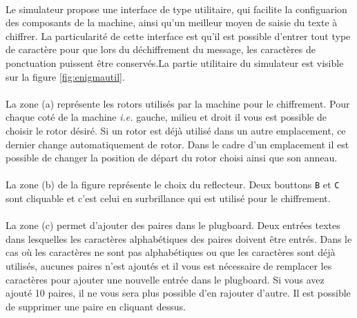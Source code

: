 \documentclass[letterpaper]{article}
\begin{document}
\paragraph{}
Le simulateur propose une interface de type utilitaire, qui facilite la configuarion des composants de la machine, ainsi qu'un meilleur moyen de saisie du texte à chiffrer. La particularité de cette interface est qu'il est possible d'entrer tout type de caractère pour que lors du déchiffrement du message, les caractères de ponctuation puissent être conservés.La partie utilitaire du simulateur est visible sur la figure \ref{fig:enigmautil}.

\paragraph{}

La zone (a) représente les rotors utilisés par la machine pour le chiffrement. Pour chaque coté de la machine \textit{i.e.} gauche, milieu et droit il vous est possible de choisir le rotor désiré. Si un rotor est déjà utilisé dans un autre emplacement, ce dernier change automatiquement de rotor. Dans le cadre d'un emplacement il est possible de changer la position de départ du rotor choisi ainsi que son anneau.

\paragraph{}
La zone (b) de la figure représente le choix du reflecteur. Deux bouttons \texttt{B} et \texttt{C} sont cliquable et c'est celui en surbrillance qui est utilisé pour le chiffrement.

\paragraph{}

La zone (c) permet d'ajouter des paires dans le plugboard. Deux entrées textes dans lesquelles les caractères alphabétiques des paires doivent être entrés. Dans le cas où les caractères ne sont pas alphabétiques ou que les caractères sont déjà utilisés, aucunes paires n'est ajoutés et il vous est nécessaire de remplacer les caractères pour ajouter une nouvelle entrée dans le plugboard. Si vous avez ajouté 10 paires, il ne vous sera plus possible d'en rajouter d'autre. Il est possible de supprimer une paire en cliquant dessus.

\paragraph{}
\end{document}
